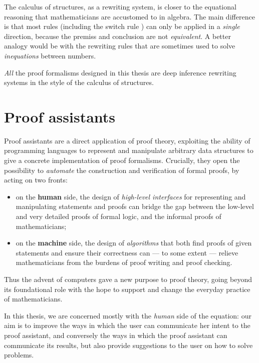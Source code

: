 The calculus of structures, as a rewriting system, is closer to the equational
reasoning that mathematicians are accustomed to in algebra. The main difference
is that most rules (including the switch rule ) can only be applied in a
\emph{single} direction, because the premiss and conclusion are not
\emph{equivalent}. A better analogy would be with the rewriting rules that are
sometimes used to solve \emph{inequations} between numbers.

\begin{emphpar}
\emph{All} the proof formalisms designed in this thesis are deep inference
rewriting systems in the style of the calculus of structures.
\end{emphpar}

\section{Proof assistants}

Proof assistants are a direct application of proof theory, exploiting the
ability of programming languages to represent and manipulate arbitrary data
structures to give a concrete implementation of proof formalisms. Crucially,
they open the possibility to \emph{automate} the construction and verification
of formal proofs, by acting on two fronts:
\begin{itemize}
  \item on the \textbf{human} side, the design of \emph{high-level interfaces}
  for representing and manipulating statements and proofs can bridge the gap
  between the low-level and very detailed proofs of formal logic, and the
  informal proofs of mathematicians;
  \item on the \textbf{machine} side, the design of \emph{algorithms} that both
  find proofs of given statements and ensure their correctness can --- to some
  extent --- relieve mathematicians from the
  burdens of proof writing and proof checking.
\end{itemize}
Thus the advent of computers gave a new purpose to proof theory, going beyond
its foundational role with the hope to support and change the everyday practice
of mathematicians.

\begin{emphpar}
In this thesis, we are concerned mostly with the \emph{human} side of the
equation: our aim is to improve the ways in which the user can communicate her
intent to the proof assistant, and conversely the ways in which the proof
assistant can communicate its results, but also provide suggestions to the user
on how to solve problems.
\end{emphpar}

